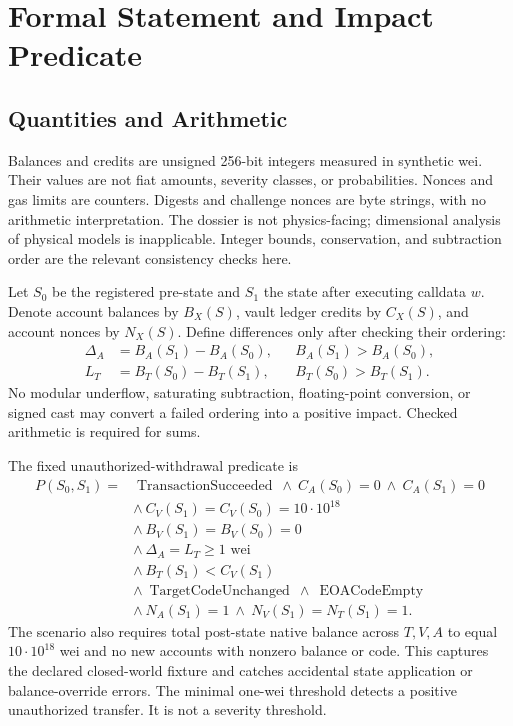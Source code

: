 \documentclass[11pt]{article}
\begin{document}
\section{Formal Statement and Impact Predicate}
\subsection{Quantities and Arithmetic}
Balances and credits are unsigned 256-bit integers measured in synthetic wei. Their values are not fiat amounts, severity classes, or probabilities. Nonces and gas limits are counters. Digests and challenge nonces are byte strings, with no arithmetic interpretation. The dossier is not physics-facing; dimensional analysis of physical models is inapplicable. Integer bounds, conservation, and subtraction order are the relevant consistency checks here.

Let \(S_0\) be the registered pre-state and \(S_1\) the state after executing calldata \(w\). Denote account balances by \(B_X(S)\), vault ledger credits by \(C_X(S)\), and account nonces by \(N_X(S)\). Define differences only after checking their ordering:
\begin{align}
\Delta_A &= B_A(S_1)-B_A(S_0), && B_A(S_1)>B_A(S_0),\\
L_T &= B_T(S_0)-B_T(S_1), && B_T(S_0)>B_T(S_1).
\end{align}
No modular underflow, saturating subtraction, floating-point conversion, or signed cast may convert a failed ordering into a positive impact. Checked arithmetic is required for sums.

The fixed unauthorized-withdrawal predicate is
\begin{equation}
\begin{aligned}
P(S_0,S_1) ={}& \operatorname{TransactionSucceeded}\ \land\ C_A(S_0)=0\ \land\ C_A(S_1)=0\\
&\land\ C_V(S_1)=C_V(S_0)=10\cdot10^{18}\\
&\land\ B_V(S_1)=B_V(S_0)=0\\
&\land\ \Delta_A=L_T\geq 1\text{ wei}\\
&\land\ B_T(S_1)<C_V(S_1)\\
&\land\ \operatorname{TargetCodeUnchanged}\ \land\ \operatorname{EOACodeEmpty}\\
&\land\ N_A(S_1)=1\ \land\ N_V(S_1)=N_T(S_1)=1.
\end{aligned}
\end{equation}
The scenario also requires total post-state native balance across \(T,V,A\) to equal \(10\cdot10^{18}\) wei and no new accounts with nonzero balance or code. This captures the declared closed-world fixture and catches accidental state application or balance-override errors. The minimal one-wei threshold detects a positive unauthorized transfer. It is not a severity threshold.
\end{document}
